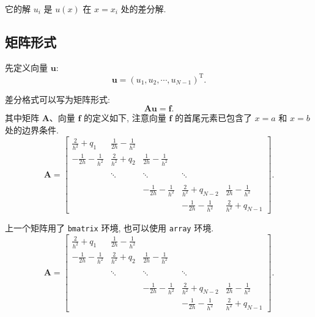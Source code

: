 \documentclass[UTF8,openany,twoside,12pt]{ctexbook}
\theoremstyle{plain}
\begin{document}
它的解 $u_i$ 是 $u(x)$ 在 $x=x_i$ 处的差分解.


\subsection{矩阵形式}

先定义向量 $\boldsymbol{u}$:
\begin{equation*}
  \boldsymbol{u}=(u_{1}, u_{2}, \cdots, u_{N-1})^{\mathrm{T}}.
\end{equation*}

差分格式可以写为矩阵形式:
\begin{equation*}
  \boldsymbol{A}\boldsymbol{u}=\boldsymbol{f}.
\end{equation*}
其中矩阵 $\boldsymbol{A}$、向量 $\boldsymbol{f}$ 的定义如下, 注意向量 $\boldsymbol{f}$ 的首尾元素已包含了 $x=a$ 和 $x=b$ 处的边界条件.
\begin{equation}\label{eq:matrix1}
\boldsymbol{A}=\begin{bmatrix}
\frac{2}{h^{2}}+q_{1} & \frac{1}{2h}-\frac{1}{h^{2}} &   &  &  \\[8pt]
 -\frac{1}{2h}-\frac{1}{h^{2}} & \frac{2}{h^{2}}+q_{2} & \frac{1}{2h}-\frac{1}{h^{2}}  & &  \\[8pt]
  &  &  &  &    \\
  &  \ddots  & \ddots  &  \ddots  &  \\[8pt]
  &  &  &  &    \\
  &   & -\frac{1}{2h}-\frac{1}{h^{2}} & \frac{2}{h^{2}}+q_{N-2}& \frac{1}{2h}-\frac{1}{h^{2}} \\[8pt]
  &  &  & -\frac{1}{2h}-\frac{1}{h^{2}} & \frac{2}{h^{2}}+q_{N-1}
\end{bmatrix}.
\end{equation}

上一个矩阵用了 \verb|bmatrix| 环境, 也可以使用 \verb|array| 环境.
\begin{equation}\label{eq:matrix2}
\boldsymbol{A}=\left[\begin{array}{cccccc}
\frac{2}{h^{2}}+q_{1} & \frac{1}{2h}-\frac{1}{h^{2}} &  &  &  \\[8pt]
 -\frac{1}{2h}-\frac{1}{h^{2}} & \frac{2}{h^{2}}+q_{2} & \frac{1}{2h}-\frac{1}{h^{2}}  & &  \\[8pt]
  &  &  &  &   \\
  &  \ddots  & \ddots & \ddots &  \\[8pt]
  &  &  &  &   \\
  &   & -\frac{1}{2h}-\frac{1}{h^{2}} & \frac{2}{h^{2}}+q_{N-2} & \frac{1}{2h}-\frac{1}{h^{2}} \\[8pt]
  &  &  & -\frac{1}{2h}-\frac{1}{h^{2}} & \frac{2}{h^{2}}+q_{N-1}
\end{array}\right].
\end{equation}
\end{document}
